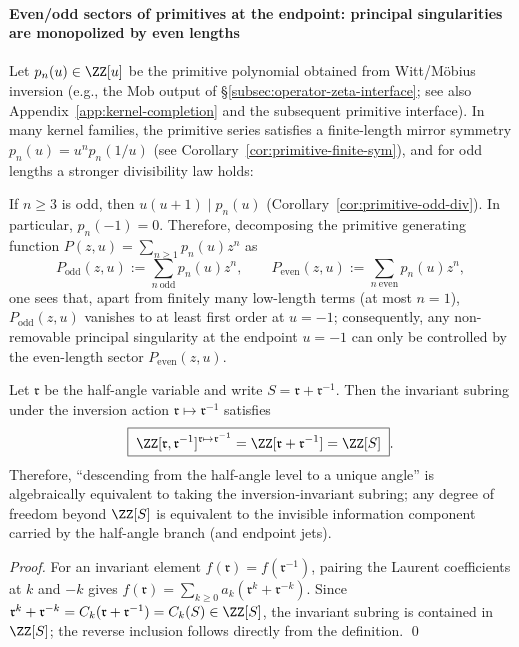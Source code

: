 \paragraph{Even/odd sectors of primitives at the endpoint: principal singularities are monopolized by even lengths}
Let \(p_n(u)\in\ZZ[u]\) be the primitive polynomial obtained from Witt/M\"obius inversion (e.g., the \(\mathrm{Mob}\) output of \S\ref{subsec:operator-zeta-interface}; see also Appendix~\ref{app:kernel-completion} and the subsequent primitive interface).
In many kernel families, the primitive series satisfies a finite-length mirror symmetry \(p_n(u)=u^n p_n(1/u)\) (see Corollary~\ref{cor:primitive-finite-sym}), and for odd lengths a stronger divisibility law holds:

\begin{corollary}\label{cor:primitive-odd-vanish-u-minus1}
If \(n\ge 3\) is odd, then \(u(u+1)\mid p_n(u)\) (Corollary~\ref{cor:primitive-odd-div}).
In particular, \(p_n(-1)=0\).
Therefore, decomposing the primitive generating function \(P(z,u)=\sum_{n\ge 1}p_n(u)z^n\) as
\[
P_{\mathrm{odd}}(z,u):=\sum_{n\ \mathrm{odd}}p_n(u)z^n,\qquad
P_{\mathrm{even}}(z,u):=\sum_{n\ \mathrm{even}}p_n(u)z^n,
\]
one sees that, apart from finitely many low-length terms (at most \(n=1\)), \(P_{\mathrm{odd}}(z,u)\) vanishes to at least first order at \(u=-1\);
consequently, any non-removable principal singularity at the endpoint \(u=-1\) can only be controlled by the even-length sector \(P_{\mathrm{even}}(z,u)\).
\end{corollary}

\begin{proposition}\label{prop:completion-subring-unique-angle}
Let \(\mathfrak{r}\) be the half-angle variable and write \(S=\mathfrak{r}+\mathfrak{r}^{-1}\).
Then the invariant subring under the inversion action \(\mathfrak{r}\mapsto \mathfrak{r}^{-1}\) satisfies
\[
\boxed{\;\ZZ[\mathfrak{r},\mathfrak{r}^{-1}]^{\mathfrak{r}\mapsto \mathfrak{r}^{-1}}
=\ZZ[\mathfrak{r}+\mathfrak{r}^{-1}]
=\ZZ[S]\; }.
\]
Therefore, ``descending from the half-angle level to a unique angle'' is algebraically equivalent to taking the inversion-invariant subring; any degree of freedom beyond \(\ZZ[S]\) is equivalent to the invisible information component carried by the half-angle branch (and endpoint jets).
\end{proposition}
\begin{proof}
For an invariant element \(f(\mathfrak{r})=f(\mathfrak{r}^{-1})\), pairing the Laurent coefficients at \(k\) and \(-k\) gives
\(
f(\mathfrak{r})=\sum_{k\ge 0}a_k(\mathfrak{r}^k+\mathfrak{r}^{-k})
\).
Since \(\mathfrak{r}^k+\mathfrak{r}^{-k}=C_k(\mathfrak{r}+\mathfrak{r}^{-1})=C_k(S)\in\ZZ[S]\), the invariant subring is contained in \(\ZZ[S]\); the reverse inclusion follows directly from the definition. \qed
\end{proof}

